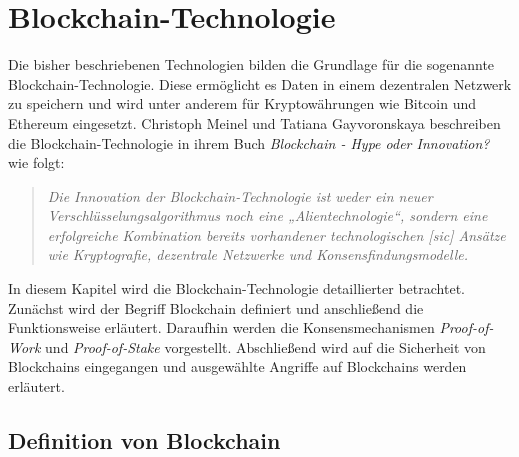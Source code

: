 \section{Blockchain-Technologie}
\label{sec:blockchain_basics}


Die bisher beschriebenen Technologien bilden die Grundlage für die sogenannte Blockchain-Technologie. Diese ermöglicht es Daten in einem dezentralen Netzwerk zu speichern und wird unter anderem für Kryptowährungen wie Bitcoin und Ethereum eingesetzt. Christoph Meinel und Tatiana Gayvoronskaya beschreiben die Blockchain-Technologie in ihrem Buch \textit{Blockchain - Hype oder Innovation?} wie folgt:

\begin{quote}
    \textit{Die Innovation der Blockchain-Technologie ist weder ein neuer Verschlüsselungsalgorithmus noch eine „Alientechnologie“, sondern eine erfolgreiche Kombination bereits vorhandener technologischen [sic] Ansätze wie Kryptografie, dezentrale Netzwerke und Konsensfindungsmodelle.} \\ \parencite[S. 17]{Meinel_BlockchainHypeInnovation}
\end{quote}

\noindent In diesem Kapitel wird die Blockchain-Technologie detaillierter betrachtet. Zunächst wird der Begriff Blockchain definiert und anschließend die Funktionsweise erläutert. Daraufhin werden die Konsensmechanismen \textit{Proof-of-Work} und \textit{Proof-of-Stake} vorgestellt. Abschließend wird auf die Sicherheit von Blockchains eingegangen und ausgewählte Angriffe auf Blockchains werden erläutert.


\subsection{Definition von Blockchain}
\label{subsec:blockchain_definition}

